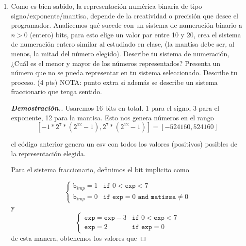 \documentclass{article}
\begin{document}
\begin{enumerate}
	\item Como es bien sabido, la representaci\'on num\'erica binaria de tipo signo/exponente/mantisa, depende de la creatividad o precisi\'on que desee el programador. Analicemos qu\'e sucede con un sistema de numeraci\'on binario a $n>0$ (entero) bits, para esto elige un valor par entre 10 y 20, crea el sistema de numeraci\'on entero similar al estudiado en clase, (la mantisa debe ser, al menos, la mitad del n\'umero elegido). Describe tu sistema de numeraci\'on, ¿Cu\'al es el menor y mayor de los n\'umeros representados? Presenta un n\'umero que no se pueda representar en tu sistema seleccionado. Describe tu proceso. (4 pts) NOTA: punto extra si adem\'as se describe un sistema fraccionario que tenga sentido.
	      \begin{mdframed}[
			      linecolor=darkgray,
			      backgroundcolor=white]
		      \begin{proof}[\textbf{Demostraci\'on.}]
			      Usaremos 16 bits en total. 1 para el signo, 3 para el exponente, 12 para la mantisa. Esto nos genera n\'umeros en el rango
			      \[ [-1*2^7*(2^{12} - 1), 2^7*(2^{12} - 1)] = [-524160, 524160] \]

			      


			      el c\'odigo anterior genera un csv con todos los valores (positivos) posibles de la representaci\'on elegida.

			      Para el sistema fraccionario, definimos el bit implicito como

			      $$
				      \begin{cases}
					      \texttt{b}_{imp}= 1   & \texttt{if } 0 <\texttt{exp} < 7                           \\
					      \texttt{b}_{imp} =  0 & \texttt{if } \texttt{exp} = 0 \texttt{ and matissa} \neq 0
				      \end{cases}
			      $$
			      y
			      $$
				      \begin{cases}
					      \texttt{exp}=\texttt{exp}-3 & \texttt{if } 0 <\texttt{exp} < 7 \\
					      \texttt{exp} = 2            & \texttt{if } \texttt{exp} = 0
				      \end{cases}
			      $$
			      de esta manera, obtenemos los valores que

		      \end{proof}
	      \end{mdframed}


\end{enumerate}
\end{document}
